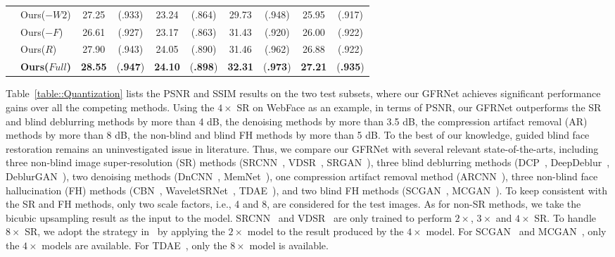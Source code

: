 \documentclass[runningheads]{llncs}
\begin{document}
\begin{table*}[t]
{\begin{center}
\begin{tabular}{ c| l|c c c  c|c c c c}
				&Ours($-W2$) & 27.25 & (.933) & 23.24 & (.864) & 29.73 & (.948)& 25.95 & (.917) \\
				&Ours($-F$)& 26.61 & (.927) & 23.17 & (.863) & 31.43 & (.920) & 26.00 & (.922)\\
				&Ours($R$)& 27.90 & (.943) & 24.05 & (.890) & 31.46 & (.962) & 26.88 & (.922)\\
				&{\bf Ours($Full$)}& {\bf \color{red}28.55} & ({\bf \color{red}.947}) & {\bf \color{red}24.10} & ({\bf \color{red}.898})& {\bf \color{red}32.31} & ({\bf \color{red}.973}) & {\bf \color{red}27.21} & ({\bf \color{red}.935})\\
				\hline
			\end{tabular}\end{center}
	}
\end{table*}
Table~\ref{table::Quantization} lists the PSNR and SSIM results on the two test subsets, where our GFRNet achieves significant performance gains over all the competing methods.
Using the $4\times$ SR on WebFace as an example, in terms of PSNR, our GFRNet outperforms the {SR} and blind deblurring methods by more than 4 dB, the denoising methods by more than 3.5 dB, the {compression artifact removal (AR)} methods by more than 8 dB, the non-blind and blind {FH} methods by more than 5 dB.
To the best of our knowledge, guided blind face restoration remains an uninvestigated issue in literature.
Thus, we compare our GFRNet with several relevant state-of-the-arts, including three non-blind image super-resolution (SR) methods (SRCNN~\cite{dong2014learning}, VDSR~\cite{kim2016accurate}, SRGAN~\cite{Ledig2017CVPR}), three blind deblurring methods (DCP~\cite{pan2016blind}, DeepDeblur~\cite{Nah2017CVPR}, DeblurGAN~\cite{DeblurGAN}), two denoising methods (DnCNN~\cite{zhang2017beyond}, MemNet~\cite{MemNet}), one compression artifact removal method (ARCNN~\cite{Dong2015ICCV}), three non-blind face hallucination (FH) methods (CBN~\cite{zhu2016deep}, WaveletSRNet~\cite{huang2017wavelet}, TDAE~\cite{yu2017hallucinating}),
and two blind FH methods (SCGAN~\cite{xu2017learning}, MCGAN~\cite{xu2017learning}).
To keep consistent with the SR and FH methods, only two scale factors, i.e., 4 and 8, are considered for the test images.
As for non-SR methods, we take the bicubic upsampling result as the input to the model.
SRCNN~\cite{dong2014learning} and VDSR~\cite{kim2016accurate} are only trained to perform $2\times$, $3\times$ and $4\times$ SR.
To handle $8\times$ SR, we adopt the strategy in~\cite{tuzel2016global} by applying the $2\times$ model to the result produced by the $4\times$ model.
For SCGAN~\cite{xu2017learning} and MCGAN~\cite{xu2017learning}, only the $4\times$ models are available. For TDAE~\cite{yu2017hallucinating}, only the $8\times$ model is available.
\end{document}
